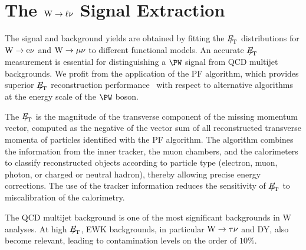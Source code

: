 \section{\texorpdfstring{The $\mathrm{W} \rightarrow \ell\nu$  Signal Extraction}{The W-> l nu  Signal Extraction}}
\label{sec:WsignalExtraction}

The signal and background yields are obtained by fitting
the ${E\!\!\!/}_{\!\mathrm{T}}$ distributions for $\mathrm{W} \rightarrow \mathrm{e}\nu$ and $\mathrm{W} \rightarrow \mu\nu$ to different
functional models.
An accurate ${E\!\!\!/}_{\!\mathrm{T}}$ measurement is essential for distinguishing
a $\PW$ signal from QCD multijet backgrounds.
We profit from the application of the PF
algorithm, which provides superior ${E\!\!\!/}_{\!\mathrm{T}}$
reconstruction performance~\cite{PFMET1} with respect to alternative
algorithms at the energy scale of the $\PW$ boson.


The ${E\!\!\!/}_{\!\mathrm{T}}$ is the magnitude of the transverse component of the missing momentum
vector, computed as the negative of the vector sum of all
reconstructed transverse momenta of particles identified with
the PF algorithm. The algorithm combines the information from
the inner tracker, the muon chambers, and the calorimeters
to classify reconstructed objects according to particle type
(electron, muon, photon, or charged or neutral hadron),
thereby allowing precise energy corrections.
The use of the tracker information reduces the sensitivity of ${E\!\!\!/}_{\!\mathrm{T}}$ to miscalibration of the calorimetry.

\par
The QCD multijet background is one of the most significant backgrounds in W analyses.
At high ${E\!\!\!/}_{\!\mathrm{T}}$, EWK backgrounds, in particular $\mathrm{W} \rightarrow \tau\nu$ and DY,
also become relevant, leading to contamination levels on the
order of $10\%$.

